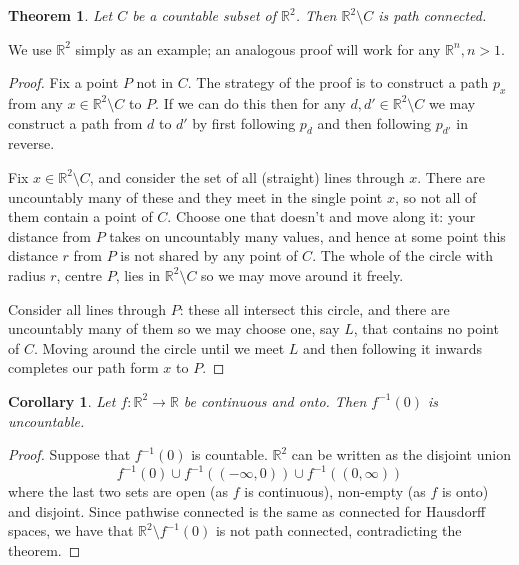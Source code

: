 \documentclass[12pt]{article}
\newtheorem{theo}{Theorem}
\newtheorem{coro}{Corollary}
\begin{document}
\begin{theo} Let $C$ be a countable subset of $\mathbb{R}^2$.  Then $\mathbb{R}^2\setminus C$ is path connected.\end{theo}

We use $\mathbb{R}^2$ simply as an example; an analogous proof will work for any $\mathbb{R}^n, n>1$.

\begin{proof}
Fix a point $P$ not in $C$.  The strategy of the proof is to construct a path $p_x$ from any $x \in \mathbb{R}^2\setminus C$ to $P$. If we can do this then for any $d, d' \in \mathbb{R}^2\setminus C$ we may construct a path from $d$ to $d'$ by first following $p_d$ and then following $p_{d'}$ in reverse.

Fix $x \in \mathbb{R}^2\setminus C$, and consider the set of all (straight) lines through $x$.  There are uncountably many of these and they meet in the single point $x$, so not all of them contain a point of $C$.  Choose one that doesn't and move along it:  your distance from $P$ takes on uncountably many values, and hence at some point this distance $r$ from $P$ is not shared by any point of $C$.  The whole of the circle with radius $r$, centre $P$, lies in $\mathbb{R}^2\setminus C$ so we may move around it freely.

Consider all lines through $P$:  these all intersect this circle, and there are uncountably many of them so we may choose one, say $L$, that contains no point of $C$.  Moving around the circle until we meet $L$ and then following it inwards completes our path form $x$ to $P$.
\end{proof} 

\begin{coro} Let $f: \mathbb{R}^2 \rightarrow \mathbb{R}$ be continuous and onto.  Then $f^{-1} (0)$ is uncountable.  \end{coro}

\begin{proof} Suppose that $f^{-1} (0)$ is countable.  $\mathbb{R}^2$ can be written as the disjoint union
\[ f^{-1} (0) \cup f^{-1} ((-\infty, 0)) \cup f^{-1} ((0, \infty)) \]
where the last two sets are open (as $f$ is continuous), non-empty (as $f$ is onto) and disjoint.  Since pathwise connected is the same as connected for Hausdorff spaces, we have that $\mathbb{R}^2 \setminus  f^{-1} (0)$ is not path connected, contradicting the theorem.
\end{proof}
\end{document}
